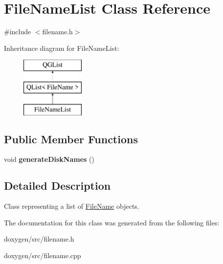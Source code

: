 \hypertarget{class_file_name_list}{}\section{File\+Name\+List Class Reference}
\label{class_file_name_list}


{\ttfamily \#include $<$filename.\+h$>$}

Inheritance diagram for File\+Name\+List\+:\begin{figure}[H]
\begin{center}
\leavevmode
\includegraphics[height=3.000000cm]{class_file_name_list}
\end{center}
\end{figure}
\subsection*{Public Member Functions}
\begin{DoxyCompactItemize}
\item 
\mbox{\label{class_file_name_list_aa27f00a47431c52d84ef03e51a8498ae}} 
void {\bfseries generate\+Disk\+Names} ()
\end{DoxyCompactItemize}


\subsection{Detailed Description}
Class representing a list of \mbox{\hyperlink{class_file_name}{File\+Name}} objects. 

The documentation for this class was generated from the following files\+:\begin{DoxyCompactItemize}
\item 
doxygen/src/filename.\+h\item 
doxygen/src/filename.\+cpp\end{DoxyCompactItemize}
